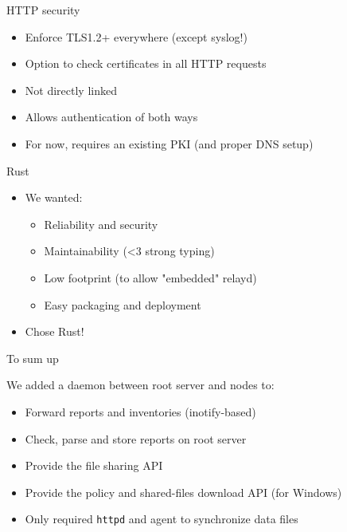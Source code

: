 \documentclass[aspectratio=169, 14pt]{beamer}
\begin{document}
\begin{frame}{HTTP security}
	\begin{itemize}
		\item Enforce TLS1.2+ everywhere (except syslog!)
		\item Option to check certificates in all HTTP requests
		\item Not directly linked
		\item Allows authentication of both ways
		\item For now, requires an existing PKI (and proper DNS setup)
	\end{itemize}
\end{frame}

\begin{frame}{Rust}


	\begin{itemize}
		\item We wanted:
		      \begin{itemize}
			      \item Reliability and security
			      \item Maintainability (<3 strong typing)
			      \item Low footprint (to allow "embedded" relayd)
			      \item Easy packaging and deployment
		      \end{itemize}
		\item Chose Rust!
	\end{itemize}
\end{frame}

\begin{frame}{To sum up}

We added a daemon between root server and nodes to:

	\begin{itemize}
	  \item Forward reports and inventories (inotify-based)
	  \item Check, parse and store reports on root server
	  \item Provide the file sharing API
	  \item Provide the policy and shared-files download API (for Windows)
	  \item Only required \texttt{httpd} and agent to synchronize data files
	\end{itemize}
\end{frame}
\end{document}
